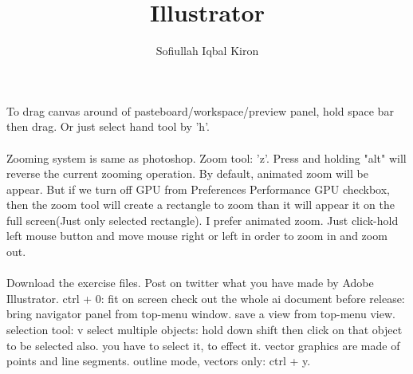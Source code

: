 \documentclass[11 pt]{article}
\title{Illustrator}
\author{Sofiullah Iqbal Kiron}
\begin{document}
\maketitle

\justify
To drag canvas around of pasteboard/workspace/preview panel, hold space bar then drag. Or just select hand tool by 'h'. \\ \\
Zooming system is same as photoshop. Zoom tool: 'z'. Press and holding "alt" will reverse the current zooming operation. By default, animated zoom will be appear. But if we turn off GPU from Preferences Performance GPU checkbox, then the zoom tool will create a rectangle to zoom than it will appear it on the full screen(Just only selected rectangle). I prefer animated zoom. Just click-hold left mouse button and move mouse right or left in order to zoom in and zoom out. \\ \\
Download the exercise files. Post on twitter what you have made by Adobe Illustrator.
ctrl + 0: fit on screen
check out the whole ai document before release: bring navigator panel from top-menu window.
save a view from top-menu view.
selection tool: v
select multiple objects: hold down shift then click on that object to be selected also.
you have to select it, to effect it.
vector graphics are made of points and line segments.
outline mode, vectors only: ctrl + y.
\end{document}
